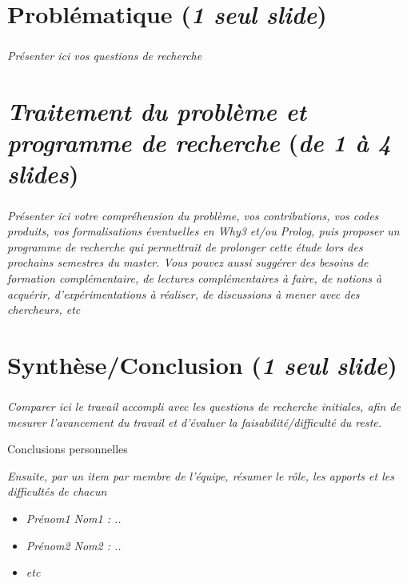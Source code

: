 \documentclass[9pt,handout]{beamer}
\begin{document}
\section{Problématique (\textit{1 seul slide})}

\begin{frame}
\frametitle{\secname}

\textit{Présenter ici vos questions de recherche}

\end{frame}


\section{\textit{Traitement du problème et programme de recherche} (\textit{de 1 à 4 slides})}

\begin{frame}
\frametitle{\secname}

\textit{Présenter ici votre compréhension du problème, vos contributions, vos codes produits, vos formalisations éventuelles en Why3 et/ou Prolog, puis proposer un programme de recherche qui permettrait de prolonger cette étude lors des prochains semestres du master. Vous pouvez aussi suggérer des besoins de formation complémentaire, de lectures complémentaires à faire, de notions à acquérir, d'expérimentations à réaliser, de discussions à mener avec des chercheurs, etc}

\end{frame}

\section{Synthèse/Conclusion (\textit{1 seul slide})}

\begin{frame}
\frametitle{\secname}

\textit{Comparer ici le travail accompli avec les questions de recherche initiales, afin de mesurer l'avancement du travail et d'évaluer la faisabilité/difficulté du reste.}

\bigskip

Conclusions personnelles

\textit{Ensuite, par un item par membre de l'équipe, résumer le rôle, les apports et les difficultés de chacun}
\begin{itemize}
\item \textit{Prénom1 Nom1 : ..}
\item \textit{Prénom2 Nom2 : ..}
\item \textit{etc}
\end{itemize}
\end{frame}
\end{document}
